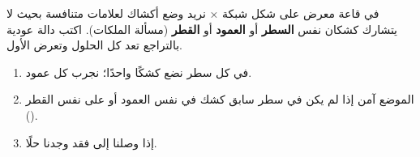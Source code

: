 \begin{statement}
في قاعة معرض على شكل شبكة × نريد وضع  أكشاك لعلامات متنافسة بحيث لا يتشارك كشكان نفس \textbf{السطر} أو \textbf{العمود} أو \textbf{القطر} (مسألة الملكات). اكتب دالة عودية بالتراجع  تعد كل الحلول وتعرض الأول.
\end{statement}
\begin{stepsbox}\begin{enumerate}
\item في كل سطر نضع كشكًا واحدًا؛ نجرب كل عمود.
\item الموضع آمن إذا لم يكن في سطر سابق كشك في نفس العمود أو على نفس القطر ().
\item إذا وصلنا إلى  فقد وجدنا حلًا.
\end{enumerate}\end{stepsbox}
